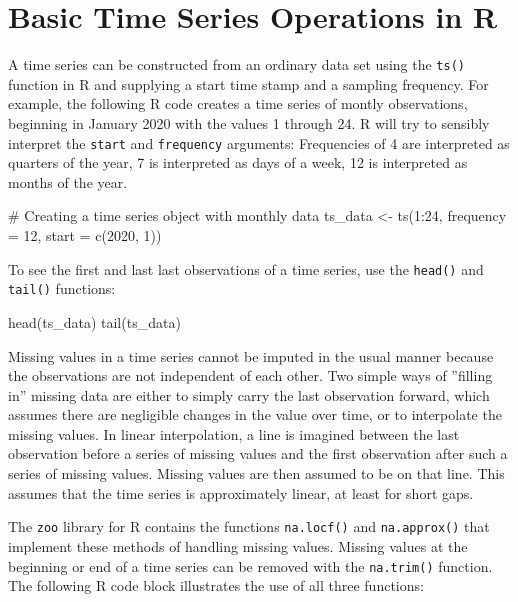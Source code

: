 \section{Basic Time Series Operations in R}

A time series can be constructed from an ordinary data set using the \texttt{ts()} function in R and supplying a start time stamp and a sampling frequency. For example, the following R code creates a time series of montly observations, beginning in January 2020 with the values 1 through 24. R will try to sensibly interpret the \texttt{start} and \texttt{frequency} arguments: Frequencies of 4 are interpreted as quarters of the year, 7 is interpreted as days of a week, 12 is interpreted as months of the year.

\begin{samepage}
\begin{Rcode}
# Creating a time series object with monthly data
ts_data <- ts(1:24, frequency = 12, start = c(2020, 1))
\end{Rcode}
\end{samepage}

\noindent To see the first and last last observations of a time series, use the \texttt{head()} and \texttt{tail()} functions:

\begin{samepage}
\begin{Rcode}
head(ts_data)
tail(ts_data)
\end{Rcode}
\end{samepage}

Missing values in a time series cannot be imputed in the usual manner because the observations are not independent of each other. Two simple ways of ''filling in'' missing data are either to simply carry the last observation forward, which assumes there are negligible changes in the value over time, or to interpolate the missing values. In linear interpolation, a line is imagined between the last observation before a series of missing values and the first observation after such a series of missing values. Missing values are then assumed to be on that line. This assumes that the time series is approximately linear, at least for short gaps. 

The \texttt{zoo} library for R contains the functions \texttt{na.locf()} and \texttt{na.approx()} that implement these methods of handling missing values. Missing values at the beginning or end of a time series can be removed with the \texttt{na.trim()} function. The following R code block illustrates the use of all three functions:

